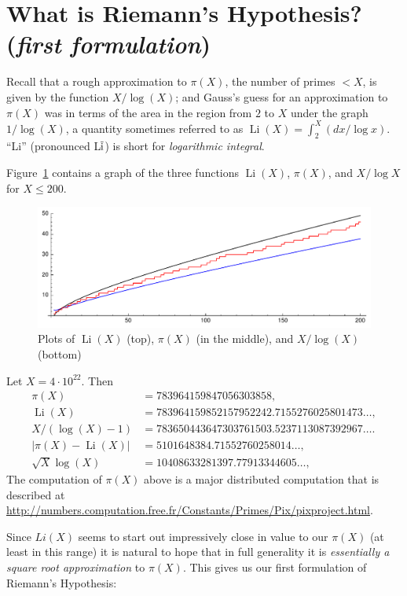 \documentclass[11pt]{article}
\DeclareMathOperator{\Li}{Li}
\theoremstyle{plain}
\theoremstyle{definition}
\numberwithin{equation}{section}
\numberwithin{figure}{section}
\numberwithin{table}{section}
\begin{document}
\section { What is Riemann's Hypothesis?  ({\em first formulation})\label{sec:rh1}}

\bigskip 

Recall that a rough approximation to $\pi(X)$, the number of primes $<
X$,  is given by the function $X/\log(X)$; and  Gauss's guess for an
approximation to $\pi(X)$  was in terms of the area in the region
from $2$ to $X$ under the graph $1/\log(X)$, a quantity sometimes referred to
as $\Li(X) = \int_2^X (dx/\log x)$.
``Li'' (pronounced L$\overline{\rm i}$) is short for {\em logarithmic integral}.


Figure~\ref{fig:threeplots} contains a graph of the three functions
$\Li(X)$, $\pi(X)$, and $X/\log X$ for $X\leq 200$.
 
\begin{figure}
\begin{center}
\includegraphics[width=.7\textwidth]{illustrations/three_plots}
\caption{Plots of $\Li(X)$ (top), $\pi(X)$ (in the middle), and $X/\log(X)$ (bottom)\label{fig:threeplots}}
\end{center}
\end{figure}
 
Let $X=4\cdot 10^{22}$.  Then \label{pili_vals}
\begin{align*}
  \pi(X) &= 783964159847056303858,\\
  \Li(X) &= 783964159852157952242.7155276025801473\ldots, \\
  X/(\log(X)-1)  &=  783650443647303761503.5237113087392967\ldots.\\
  |\pi(X) - \Li(X)| &= 5101648384.71552760258014\ldots, \\
  \sqrt{X}\log(X) &=  10408633281397.77913344605\ldots,
\end{align*}
The computation of $\pi(X)$ above is a major distributed computation
that is described at \url{http://numbers.computation.free.fr/Constants/Primes/Pix/pixproject.html}.

 

Since $Li(X)$ seems to start out impressively close in value to our
$\pi(X)$ (at least in this range) it is natural to hope that in full
generality it is {\it essentially a square root approximation} to
$\pi(X)$.  This gives us our first formulation of Riemann's
Hypothesis:
\end{document}
